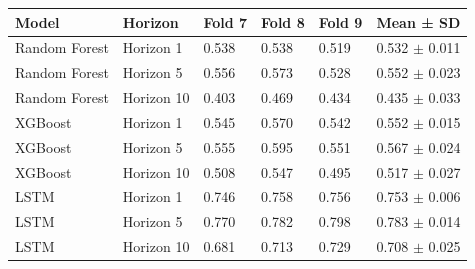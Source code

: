 \begin{tabular}{llllll}
\toprule
Model & Horizon & Fold 7 & Fold 8 & Fold 9 & Mean ± SD \\
\midrule
Random Forest & Horizon 1 & 0.538 & 0.538 & 0.519 & 0.532 $\pm$ 0.011 \\
Random Forest & Horizon 5 & 0.556 & 0.573 & 0.528 & 0.552 $\pm$ 0.023 \\
Random Forest & Horizon 10 & 0.403 & 0.469 & 0.434 & 0.435 $\pm$ 0.033 \\
XGBoost & Horizon 1 & 0.545 & 0.570 & 0.542 & 0.552 $\pm$ 0.015 \\
XGBoost & Horizon 5 & 0.555 & 0.595 & 0.551 & 0.567 $\pm$ 0.024 \\
XGBoost & Horizon 10 & 0.508 & 0.547 & 0.495 & 0.517 $\pm$ 0.027 \\
LSTM & Horizon 1 & 0.746 & 0.758 & 0.756 & 0.753 $\pm$ 0.006 \\
LSTM & Horizon 5 & 0.770 & 0.782 & 0.798 & 0.783 $\pm$ 0.014 \\
LSTM & Horizon 10 & 0.681 & 0.713 & 0.729 & 0.708 $\pm$ 0.025 \\
\bottomrule
\end{tabular}
